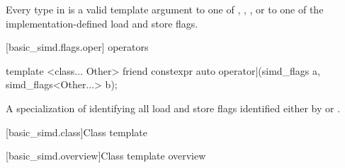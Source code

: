 \pnum\constraints
Every type in  is a valid template argument to one of
, ,
, or to one of the implementation-defined load and
store flags.

[basic_simd.flags.oper]{ operators}

\begin{itemdecl}
template <class... Other>
  friend constexpr auto operator|(simd_flags a, simd_flags<Other...> b);
\end{itemdecl}

\begin{itemdescr}
  \pnum\returns
  A specialization of  identifying all load and
  store flags identified either by  or .
\end{itemdescr}

[basic_simd.class]{Class template }

[basic_simd.overview]{Class template  overview}

